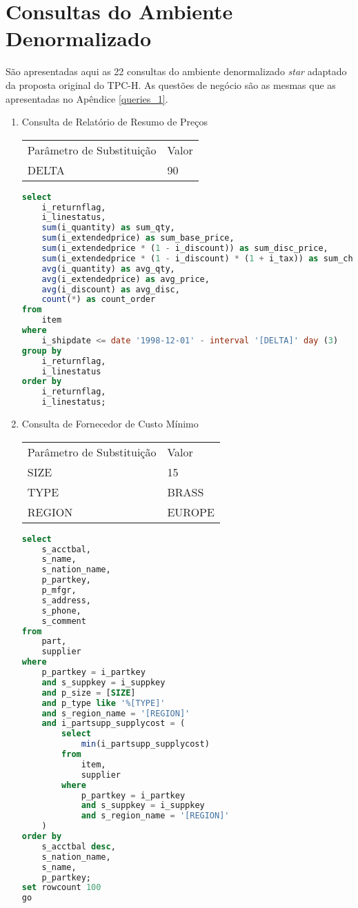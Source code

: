 
\chapter{Consultas do Ambiente Denormalizado}
\label{queries_2}


São apresentadas aqui as 22 consultas do ambiente denormalizado \textit{star} adaptado da proposta original do TPC-H. As questões de negócio são as mesmas que as apresentadas no Apêndice \ref{queries_1}.

\begin{enumerate}

\item[Q1 --] Consulta de Relatório de Resumo de Preços 

	\begin{tabular}{ll}
	Parâmetro de Substituição & Valor\\
	DELTA & 90\\
\end{tabular}
	
	\begin{lstlisting}[language=SQL]
select
    i_returnflag,
    i_linestatus,
    sum(i_quantity) as sum_qty,
    sum(i_extendedprice) as sum_base_price,
    sum(i_extendedprice * (1 - i_discount)) as sum_disc_price,
    sum(i_extendedprice * (1 - i_discount) * (1 + i_tax)) as sum_charge,
    avg(i_quantity) as avg_qty,
    avg(i_extendedprice) as avg_price,
    avg(i_discount) as avg_disc,
    count(*) as count_order
from
    item
where
    i_shipdate <= date '1998-12-01' - interval '[DELTA]' day (3)
group by
    i_returnflag,
    i_linestatus
order by
    i_returnflag,
    i_linestatus;
	\end{lstlisting}

\item[Q2 --] Consulta de Fornecedor de Custo Mínimo
	
	\begin{tabular}{ll}
	Parâmetro de Substituição & Valor\\
	SIZE & 15\\
	TYPE & BRASS\\
	REGION & EUROPE\\
\end{tabular}

	\begin{lstlisting}[language=SQL]
select
    s_acctbal,
    s_name,
    s_nation_name,
    p_partkey,
    p_mfgr,
    s_address,
    s_phone,
    s_comment
from
    part,
    supplier
where
    p_partkey = i_partkey
    and s_suppkey = i_suppkey
    and p_size = [SIZE]
    and p_type like '%[TYPE]'
    and s_region_name = '[REGION]'
    and i_partsupp_supplycost = (
        select
            min(i_partsupp_supplycost)
        from
            item,
            supplier
        where
            p_partkey = i_partkey
            and s_suppkey = i_suppkey
            and s_region_name = '[REGION]'
    )
order by
    s_acctbal desc,
    s_nation_name,
    s_name,
    p_partkey;
set rowcount 100
go
	\end{lstlisting}


\end{enumerate}
